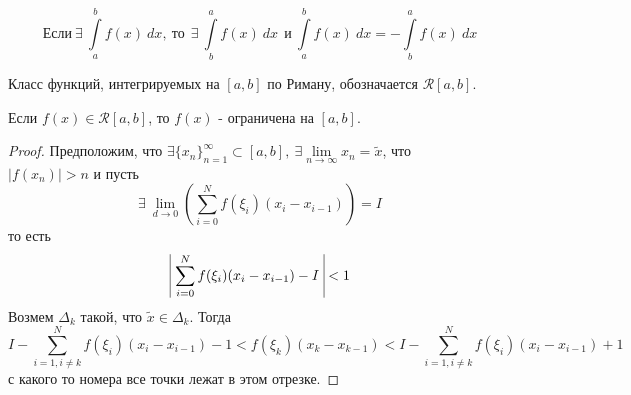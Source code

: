 \begin{statement}
    \[\text{Если}\ \exists\ \int\limits_{a}^{b}f(x)\ dx,\ \text{то}\ \ \exists\ \int\limits_{b}^{a}f(x)\ dx\ \ \text{и}\ \int\limits_{a}^{b}f(x)\ dx=-\int\limits_{b}^{a}f(x)\ dx\]
\end{statement} 
\begin{definition}
    Класс функций, интегрируемых на $[a,b]$ по Риману, обозначается $\mathcal{R}[a,b]$.
\end{definition} 
\begin{theorem}
    Если $f(x)\in \mathcal{R}[a,b]$, то $f(x)$ - ограничена на $[a,b]$.
\end{theorem} 
\begin{proof}
    Предположим, что $\exists \{x_n\}_{n=1}^{\infty}\subset [a,b],\ \exists \lim\limits_{n\to \infty}x_n=\widetilde{x}$, что\\
    $|f(x_n)|>n$ и пусть
    \[\exists\ \lim\limits_{d\to 0}\left( \sum\limits_{i=0}^{N}f(\xi_i)(x_i-x_{i-1}) \right)=I\] 
    то есть 
    \[\vline\ \sum\limits_{i=0}^{N}f(\xi_i)(x_i-x_{i-1})-I\ \vline<1\]
    Возмем $\Delta_k$ такой, что $\widetilde{x}\in \Delta_k$. Тогда
    \[I-\sum\limits_{i=1,i\ne k}^{N} f(\xi_i)(x_i-x_{i-1})-1<f(\xi_k)(x_k-x_{k-1})<I-\sum\limits_{i=1,i\ne k}^{N} f(\xi_i)(x_i-x_{i-1})+1\]
    с какого то номера все точки лежат в этом отрезке.
\end{proof} 

